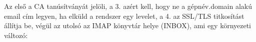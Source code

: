
Az első a CA tanúsítványát jelöli, a 3. azért kell, hogy ne a gépnév.domain alakú email cím legyen, ha elküld a
rendszer egy levelet, a 4. az SSL/TLS titkosítást állítja be, végül az utolsó az IMAP könyvtár helye (INBOX), ami egy
környezeti változó:



